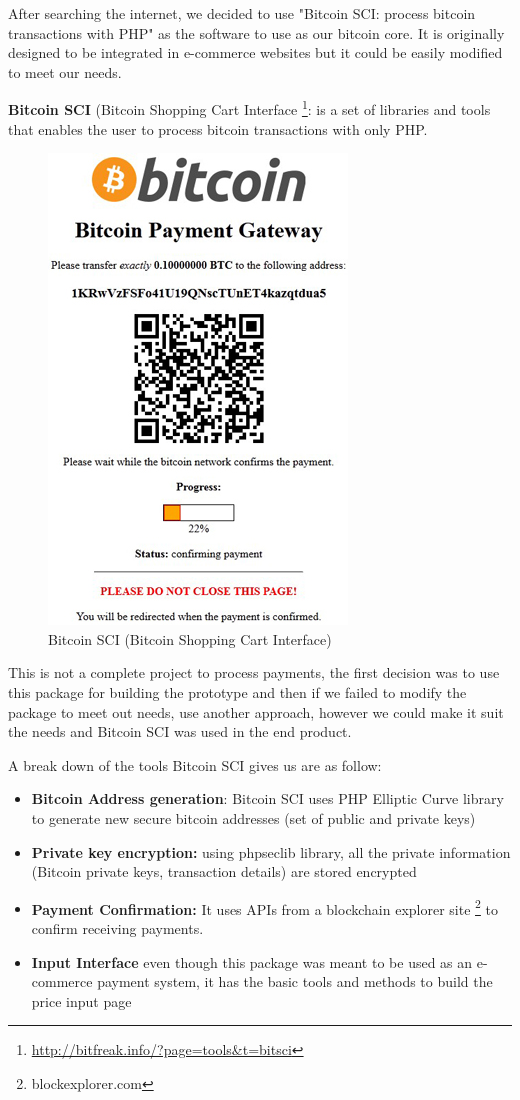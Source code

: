 After searching the internet, we decided to use "Bitcoin SCI: process bitcoin transactions with PHP" as the software to use as our bitcoin core. It is originally designed to be integrated in e-commerce websites but it could be easily modified to meet our needs. 


\textbf{Bitcoin SCI } (Bitcoin Shopping Cart Interface \footnote{\url{http://bitfreak.info/?page=tools&t=bitsci}}: is a set of libraries and tools that enables the user to process bitcoin transactions with only PHP. 

\begin{figure}[htb]
\centering
\includegraphics[scale=0.5]{fig/bitsci_screen}
  \caption{Bitcoin SCI (Bitcoin Shopping Cart Interface)}
\label{fig:bitcoin-sci}
\end{figure}


This is not a complete project to process payments, the first decision was to use this package for building the prototype and then if we failed to modify the package to meet out needs, use another approach, however we could make it suit the needs and Bitcoin SCI was used in the end product. 

A break down of the tools Bitcoin SCI gives us are as follow:
\begin{itemize}
\item \textbf{Bitcoin Address generation}:  Bitcoin SCI uses PHP Elliptic Curve library to generate new secure bitcoin addresses (set of public and private keys)
\item \textbf{Private key encryption: } using phpseclib library, all the private information (Bitcoin private keys, transaction details) are stored encrypted
\item \textbf{Payment Confirmation: } It uses APIs from a blockchain explorer site \footnote{blockexplorer.com} to confirm receiving payments.
\item \textbf{Input Interface} even though this package was meant to be used as an e-commerce payment system, it has the basic tools and methods to build the price input page
\end{itemize}


